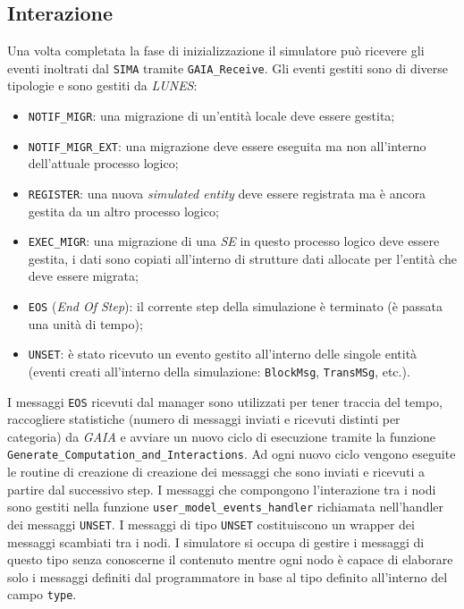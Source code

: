 \begin{code}
\section{Interazione}
Una volta completata la fase di inizializzazione il simulatore può ricevere gli eventi inoltrati dal \texttt{SIMA} tramite \texttt{GAIA\_Receive}. Gli eventi gestiti sono di diverse tipologie e sono gestiti da \textit{LUNES}:
\begin{itemize}
    \item \texttt{NOTIF\_MIGR}: una migrazione di un'entità locale deve essere gestita;
    \item \texttt{NOTIF\_MIGR\_EXT}: una migrazione deve essere eseguita ma non all'interno dell'attuale processo logico;
    \item \texttt{REGISTER}: una nuova \textit{simulated entity} deve essere registrata ma è ancora gestita da un altro processo logico;
    \item \texttt{EXEC\_MIGR}: una migrazione di una \textit{SE} in questo processo logico deve essere gestita, i dati sono copiati all'interno di strutture dati allocate per l'entità che deve essere migrata;
    \item \texttt{EOS} (\textit{End Of Step}): il corrente step della simulazione è terminato (è passata una unità di tempo);
    \item \texttt{UNSET}: è stato ricevuto un evento gestito all'interno delle singole entità (eventi creati all'interno della simulazione: \texttt{BlockMsg}, \texttt{TransMSg}, etc.).
\end{itemize}
I messaggi \texttt{EOS} ricevuti dal manager sono utilizzati per tener traccia del tempo, raccogliere statistiche (numero di messaggi inviati e ricevuti distinti per categoria) da \textit{GAIA} e avviare un nuovo ciclo di esecuzione tramite la funzione \texttt{Generate\_Computation\_and\_Interactions}. Ad ogni nuovo ciclo vengono eseguite le routine di creazione di creazione dei messaggi che sono inviati e ricevuti a partire dal successivo step.\newline
I messaggi che compongono l'interazione tra i nodi sono gestiti nella funzione \texttt{user\_model\_events\_handler} richiamata nell'handler dei messaggi \texttt{UNSET}. I messaggi di tipo \texttt{UNSET} costituiscono un wrapper dei messaggi scambiati tra i nodi. I simulatore si occupa di gestire i messaggi di questo tipo senza conoscerne il contenuto mentre ogni nodo è capace di elaborare solo i messaggi definiti dal programmatore in base al tipo definito all'interno del campo \texttt{type}.\newline

\end{code}

